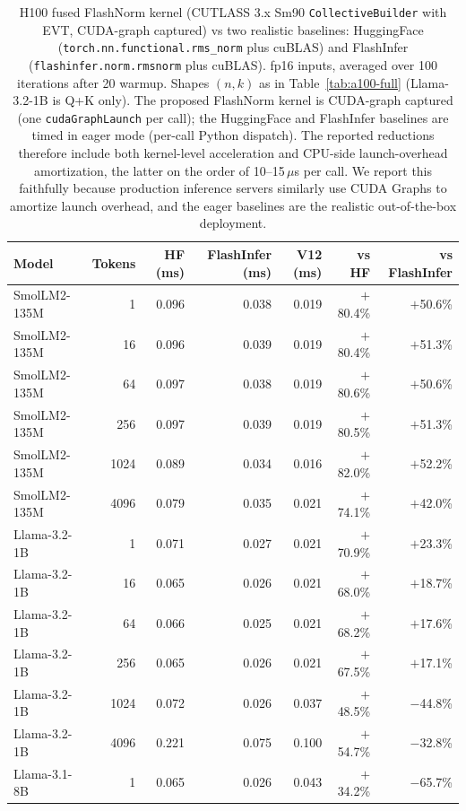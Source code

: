 \documentclass{article}
\begin{document}
\begin{table}[h!] \centering
\caption{H100 fused FlashNorm kernel (CUTLASS 3.x Sm90 \texttt{CollectiveBuilder} with EVT, CUDA-graph captured) vs two realistic baselines: HuggingFace (\texttt{torch.nn.functional.rms\_norm} plus cuBLAS) and FlashInfer (\texttt{flashinfer.norm.rmsnorm} plus cuBLAS). fp16 inputs, averaged over 100 iterations after 20 warmup. Shapes $(n, k)$ as in Table~\ref{tab:a100-full} (Llama-3.2-1B is Q+K only). The proposed FlashNorm kernel is CUDA-graph captured (one \texttt{cudaGraphLaunch} per call); the HuggingFace and FlashInfer baselines are timed in eager mode (per-call Python dispatch). The reported reductions therefore include both kernel-level acceleration and CPU-side launch-overhead amortization, the latter on the order of 10--15\,$\mu$s per call. We report this faithfully because production inference servers similarly use CUDA Graphs to amortize launch overhead, and the eager baselines are the realistic out-of-the-box deployment.}
\label{tab:h100-full}
\small
\begin{tabular}{l r r r r r r}
\hline
Model & Tokens & HF (ms) & FlashInfer (ms) & V12 (ms) & vs HF & vs FlashInfer \\
\hline
SmolLM2-135M & 1    & 0.096 & 0.038 & 0.019 & $+$80.4\% & $+$50.6\% \\
SmolLM2-135M & 16   & 0.096 & 0.039 & 0.019 & $+$80.4\% & $+$51.3\% \\
SmolLM2-135M & 64   & 0.097 & 0.038 & 0.019 & $+$80.6\% & $+$50.6\% \\
SmolLM2-135M & 256  & 0.097 & 0.039 & 0.019 & $+$80.5\% & $+$51.3\% \\
SmolLM2-135M & 1024 & 0.089 & 0.034 & 0.016 & $+$82.0\% & $+$52.2\% \\
SmolLM2-135M & 4096 & 0.079 & 0.035 & 0.021 & $+$74.1\% & $+$42.0\% \\
\hline
Llama-3.2-1B & 1    & 0.071 & 0.027 & 0.021 & $+$70.9\% & $+$23.3\% \\
Llama-3.2-1B & 16   & 0.065 & 0.026 & 0.021 & $+$68.0\% & $+$18.7\% \\
Llama-3.2-1B & 64   & 0.066 & 0.025 & 0.021 & $+$68.2\% & $+$17.6\% \\
Llama-3.2-1B & 256  & 0.065 & 0.026 & 0.021 & $+$67.5\% & $+$17.1\% \\
Llama-3.2-1B & 1024 & 0.072 & 0.026 & 0.037 & $+$48.5\% & $-$44.8\% \\
Llama-3.2-1B & 4096 & 0.221 & 0.075 & 0.100 & $+$54.7\% & $-$32.8\% \\
\hline
Llama-3.1-8B & 1    & 0.065 & 0.026 & 0.043 & $+$34.2\% & $-$65.7\% \\

\end{tabular}
\end{table}
\end{document}
